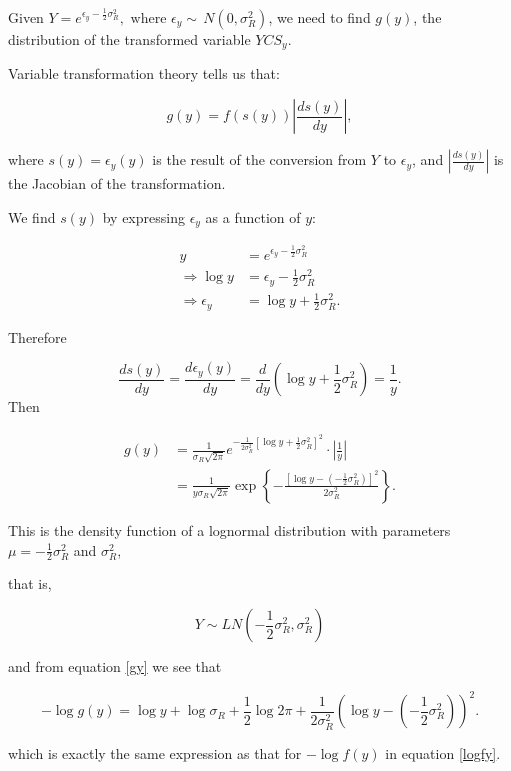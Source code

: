 \begin{appendices}
Given \(Y = e^{\epsilon_y - \frac{1}{2}\sigma^2_R},\,\, \text{where } \epsilon_y \sim \,N(0, \sigma^2_R)\), we need to find \(g(y)\), the distribution of the transformed variable \(YCS_y\).

Variable transformation theory tells us that:

\[g(y) = f(s(y))\left\vert \frac{d s(y)}{dy}\right\vert,\]

where \(s(y)=\epsilon_y(y)\) is the result of the conversion from \(Y\) to \(\epsilon_y\), and \(\left\vert \frac{d s(y)}{dy}\right\vert\) is the Jacobian of the transformation.

We find \(s(y)\) by expressing \(\epsilon_y\) as a function of \(y\):

\begin{align}
y &= e^{\epsilon_y - \frac{1}{2}\sigma^2_R} \nonumber \\
\Rightarrow \log y &= \epsilon_y - \frac{1}{2}\sigma^2_R \nonumber \\
\Rightarrow \epsilon_y &= \log y + \frac{1}{2}\sigma^2_R.
\end{align}

Therefore

\[\frac{d s(y)}{dy} = \frac{d \epsilon_y(y)}{dy} = \frac{d}{dy}\left(\log y + \frac{1}{2}\sigma^2_R\right) =\frac{1}{y}.\]
Then

\begin{align}
g(y) &= \frac{1}{\sigma_R\sqrt{2\pi}}e^{-\frac{1}{2\sigma_R^2}\left[\log y + \frac{1}{2}\sigma^2_R \right]^2}\cdot \left\vert \frac{1}{y}\right\vert \nonumber \\
&=\frac{1}{y\sigma_R\sqrt{2\pi}}\exp\left\{-\frac{[\log y - (-\frac{1}{2}\sigma^2_R)]^2}{2\sigma^2_R}\right\}.
\label{gy}
\end{align}

This is the density function of a lognormal distribution with parameters
\(\mu= -\frac{1}{2}\sigma^2_R\) and \(\sigma^2_R\),

that is,

 \[Y \sim LN\left(-\frac{1}{2}\sigma^2_R, \sigma^2_R\right)\]

and from equation \ref{gy} we see that

\begin{equation}
-\log g(y)= \log y + \log \sigma_R + \frac{1}{2}\log 2\pi + \frac{1}{2\sigma_R^2}\left(\log y - (-\frac{1}{2}\sigma^2_R)\right)^2.
\label{loggy}
\end{equation}

which is exactly the same expression as that for \(-\log f(y)\) in equation \ref{logfy}.


\end{appendices}
